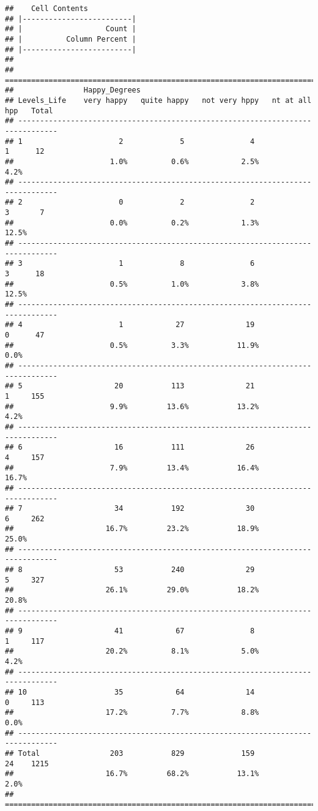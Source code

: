 \documentclass[
]{article}
\begin{document}
\begin{verbatim}
##    Cell Contents 
## |-------------------------|
## |                   Count | 
## |          Column Percent | 
## |-------------------------|
## 
## ===============================================================================
##                Happy_Degrees
## Levels_Life    very happy   quite happy   not very hppy   nt at all hpp   Total
## -------------------------------------------------------------------------------
## 1                      2             5               4               1      12 
##                      1.0%          0.6%            2.5%            4.2%        
## -------------------------------------------------------------------------------
## 2                      0             2               2               3       7 
##                      0.0%          0.2%            1.3%           12.5%        
## -------------------------------------------------------------------------------
## 3                      1             8               6               3      18 
##                      0.5%          1.0%            3.8%           12.5%        
## -------------------------------------------------------------------------------
## 4                      1            27              19               0      47 
##                      0.5%          3.3%           11.9%            0.0%        
## -------------------------------------------------------------------------------
## 5                     20           113              21               1     155 
##                      9.9%         13.6%           13.2%            4.2%        
## -------------------------------------------------------------------------------
## 6                     16           111              26               4     157 
##                      7.9%         13.4%           16.4%           16.7%        
## -------------------------------------------------------------------------------
## 7                     34           192              30               6     262 
##                     16.7%         23.2%           18.9%           25.0%        
## -------------------------------------------------------------------------------
## 8                     53           240              29               5     327 
##                     26.1%         29.0%           18.2%           20.8%        
## -------------------------------------------------------------------------------
## 9                     41            67               8               1     117 
##                     20.2%          8.1%            5.0%            4.2%        
## -------------------------------------------------------------------------------
## 10                    35            64              14               0     113 
##                     17.2%          7.7%            8.8%            0.0%        
## -------------------------------------------------------------------------------
## Total                203           829             159              24    1215 
##                     16.7%         68.2%           13.1%            2.0%        
## ===============================================================================
\end{verbatim}
\end{document}
